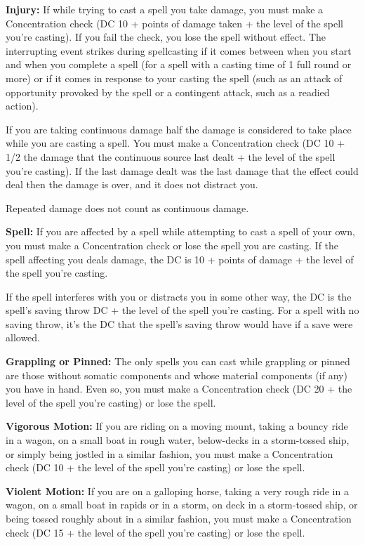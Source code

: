 \textbf{Injury:} If while trying to cast a spell you take damage, you must make 
a Concentration check (DC 10 + points of damage taken + the level of the spell 
you're casting). If you fail the check, you lose the spell without effect. The 
interrupting event strikes during spellcasting if it comes between when you start 
and when you complete a spell (for a spell with a casting time of 1 full round 
or more) or if it comes in response to your casting the spell (such as an attack 
of opportunity provoked by the spell or a contingent attack, such as a readied 
action).

If you are taking continuous damage half the damage is considered to take place 
while you are casting a spell. You must make a Concentration check (DC 10 + 1/2 
the damage that the continuous source last dealt + the level of the spell you're 
casting). If the last damage dealt was the last damage that the effect could deal 
then the damage is over, and it does not distract you.

Repeated damage does not count as continuous damage.

\textbf{Spell:} If you are affected by a spell while attempting to cast a spell 
of your own, you must make a Concentration check or lose the spell you are casting. 
If the spell affecting you deals damage, the DC is 10 + points of damage + the 
level of the spell you're casting.

If the spell interferes with you or distracts you in some other way, the DC is 
the spell's saving throw DC + the level of the spell you're casting. For a spell 
with no saving throw, it's the DC that the spell's saving throw would have if a 
save were allowed.

\textbf{Grappling or Pinned:} The only spells you can cast while grappling or pinned 
are those without somatic components and whose material components (if any) you 
have in hand. Even so, you must make a Concentration check (DC 20 + the level of 
the spell you're casting) or lose the spell.

\textbf{Vigorous Motion:} If you are riding on a moving mount, taking a bouncy 
ride in a wagon, on a small boat in rough water, below-decks in a storm-tossed 
ship, or simply being jostled in a similar fashion, you must make a Concentration 
check (DC 10 + the level of the spell you're casting) or lose the spell. 

\textbf{Violent Motion:} If you are on a galloping horse, taking a very rough ride 
in a wagon, on a small boat in rapids or in a storm, on deck in a storm-tossed 
ship, or being tossed roughly about in a similar fashion, you must make a Concentration 
check (DC 15 + the level of the spell you're casting) or lose the spell.

